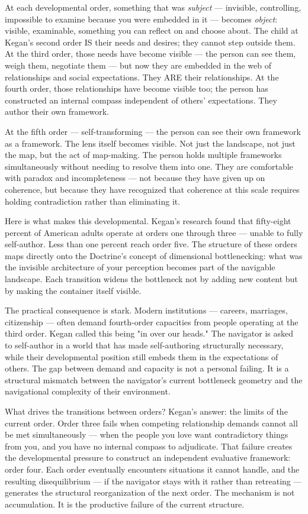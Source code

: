 At each developmental order, something that was \textit{subject} — invisible, controlling, impossible to examine because you were embedded in it — becomes \textit{object}: visible, examinable, something you can reflect on and choose about. The child at Kegan's second order IS their needs and desires; they cannot step outside them. At the third order, those needs have become visible — the person can see them, weigh them, negotiate them — but now they are embedded in the web of relationships and social expectations. They ARE their relationships. At the fourth order, those relationships have become visible too; the person has constructed an internal compass independent of others' expectations. They author their own framework.


At the fifth order — self-transforming — the person can see their own framework as a framework. The lens itself becomes visible. Not just the landscape, not just the map, but the act of map-making. The person holds multiple frameworks simultaneously without needing to resolve them into one. They are comfortable with paradox and incompleteness — not because they have given up on coherence, but because they have recognized that coherence at this scale requires holding contradiction rather than eliminating it.


Here is what makes this developmental. Kegan's research found that fifty-eight percent of American adults operate at orders one through three — unable to fully self-author. Less than one percent reach order five. The structure of these orders maps directly onto the Doctrine's concept of dimensional bottlenecking: what was the invisible architecture of your perception becomes part of the navigable landscape. Each transition widens the bottleneck not by adding new content but by making the container itself visible.


The practical consequence is stark. Modern institutions — careers, marriages, citizenship — often demand fourth-order capacities from people operating at the third order. Kegan called this being "in over our heads." The navigator is asked to self-author in a world that has made self-authoring structurally necessary, while their developmental position still embeds them in the expectations of others. The gap between demand and capacity is not a personal failing. It is a structural mismatch between the navigator's current bottleneck geometry and the navigational complexity of their environment.


What drives the transitions between orders? Kegan's answer: the limits of the current order. Order three fails when competing relationship demands cannot all be met simultaneously — when the people you love want contradictory things from you, and you have no internal compass to adjudicate. That failure creates the developmental pressure to construct an independent evaluative framework: order four. Each order eventually encounters situations it cannot handle, and the resulting disequilibrium — if the navigator stays with it rather than retreating — generates the structural reorganization of the next order. The mechanism is not accumulation. It is the productive failure of the current structure.


